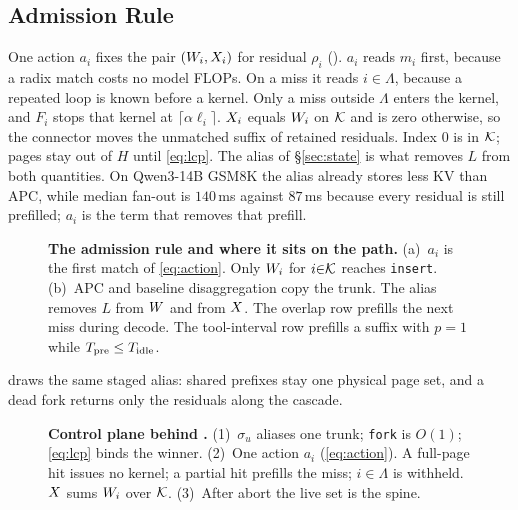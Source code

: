\subsection{Admission Rule}
\label{sec:app-detail}

One action $a_i$ fixes the pair $(W_i,X_i)$ for residual $\rho_i$ ().
$a_i$ reads $m_i$ first, because a radix match costs no model FLOPs.
On a miss it reads $i{\in}\Lambda$, because a repeated loop is known before a kernel.
Only a miss outside $\Lambda$ enters the kernel, and $F_i$ stops that kernel at $\lceil\alpha\ell_i\rceil$.
$X_i$ equals $W_i$ on $\mathcal{K}$ and is zero otherwise, so the connector moves the unmatched suffix of retained residuals.
Index $0$ is in $\mathcal{K}$; pages stay out of $H$ until \eqref{eq:lcp}.
The alias of \S\ref{sec:state} is what removes $L$ from both quantities.
On Qwen3-14B GSM8K the alias already stores less KV than APC, while median fan-out is $140$\,ms against $87$\,ms because every residual is still prefilled; $a_i$ is the term that removes that prefill.

\begin{figure}[t]
\centering
\resizebox{\textwidth}{!}{}
\caption{\textbf{The admission rule and where it sits on the path.}
(a)~$a_i$ is the first match of \eqref{eq:action}. Only $W_i$ for $i{\in}\mathcal{K}$ reaches \texttt{insert}.
(b)~APC and baseline disaggregation copy the trunk. The alias removes $L$ from $W$ and from $X$.
The overlap row prefills the next miss during decode. The tool-interval row prefills a suffix with $p{=}1$ while $T_{\mathrm{pre}}\le T_{\mathrm{idle}}$.}
\label{fig:app}
\end{figure}

 draws the same staged alias: shared prefixes stay one physical page set, and a dead fork returns only the residuals along the cascade.

\begin{figure}[t]
\centering
\resizebox{\textwidth}{!}{}
\caption{\textbf{Control plane behind .}
(1)~$\sigma_u$ aliases one trunk; \texttt{fork} is $O(1)$; \eqref{eq:lcp} binds the winner.
(2)~One action $a_i$ (\eqref{eq:action}).
A full-page hit issues no kernel; a partial hit prefills the miss; $i{\in}\Lambda$ is withheld.
$X$ sums $W_i$ over $\mathcal{K}$.
(3)~After abort the live set is the spine.}
\label{fig:arch-detail}
\end{figure}

